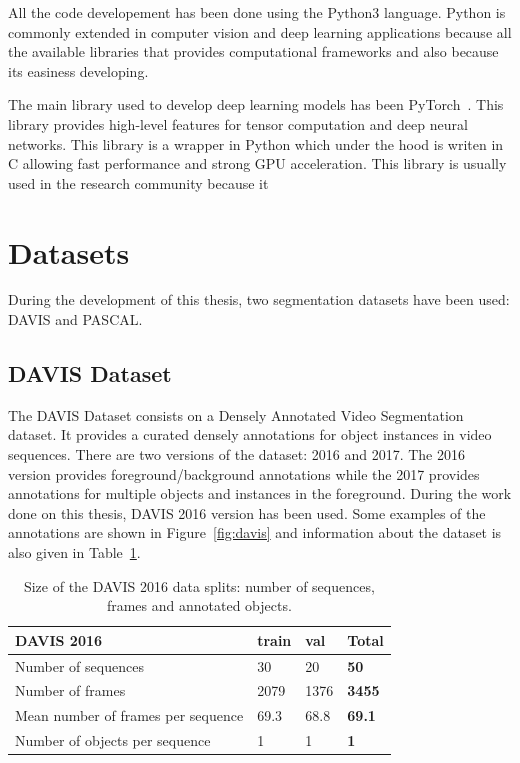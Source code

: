 All the code developement has been done using the Python3 language.
Python is commonly extended in computer vision and deep learning applications because all the available libraries that provides computational frameworks and also because its easiness developing.

The main library used to develop deep learning models has been PyTorch~\cite{paszke2017automatic}. This library provides high-level features for tensor computation and deep neural networks.
This library is a wrapper in Python which under the hood is writen in C allowing fast performance and strong GPU acceleration.
This library is usually used in the research community because it

\section{Datasets}

During the development of this thesis, two segmentation datasets have been used: DAVIS and PASCAL.


\subsection{DAVIS Dataset}

The DAVIS Dataset \cite{Perazzi2016} consists on a Densely Annotated Video Segmentation dataset.
It provides a curated densely annotations for object instances in video sequences.
There are two versions of the dataset: 2016 and 2017. The 2016 version provides foreground/background annotations while the 2017 provides annotations for multiple objects and instances in the foreground.
During the work done on this thesis, DAVIS 2016 version has been used.
Some examples of the annotations are shown in Figure~\ref{fig:davis} and information about the dataset is also given in Table~\ref{table:davis}.

\begin{table}[h]
\centering
\begin{tabular}{l|lll}
DAVIS 2016                         & train & val  & \textbf{Total} \\
\hline
Number of sequences                & 30    & 20   & \textbf{50}    \\
Number of frames                   & 2079  & 1376 & \textbf{3455}  \\
Mean number of frames per sequence & 69.3  & 68.8 & \textbf{69.1}  \\
Number of objects per sequence     & 1     & 1    & \textbf{1}     \\
\end{tabular}
\caption{Size of the DAVIS 2016 data splits: number of sequences, frames and annotated objects.}
\label{table:davis}
\end{table}


